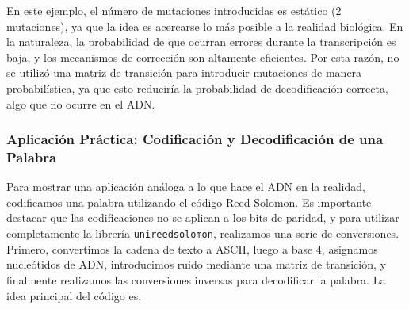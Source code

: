 En este ejemplo, el número de mutaciones introducidas es estático (2 mutaciones), ya que la idea es acercarse lo más posible a la realidad biológica. En la naturaleza, la probabilidad de que ocurran errores durante la transcripción es baja, y los mecanismos de corrección son altamente eficientes. Por esta razón, no se utilizó una matriz de transición para introducir mutaciones de manera probabilística, ya que esto reduciría la probabilidad de decodificación correcta, algo que no ocurre en el ADN.




\subsubsection{Aplicación Práctica: Codificación y Decodificación de una Palabra}

Para mostrar una aplicación análoga a lo que hace el ADN en la realidad, codificamos una palabra utilizando el código Reed-Solomon. Es importante destacar que las codificaciones no se aplican a los bits de paridad, y para utilizar completamente la librería \texttt{unireedsolomon}, realizamos una serie de conversiones. Primero, convertimos la cadena de texto a ASCII, luego a base 4, asignamos nucleótidos de ADN, introducimos ruido mediante una matriz de transición, y finalmente realizamos las conversiones inversas para decodificar la palabra. La idea principal del código es,

